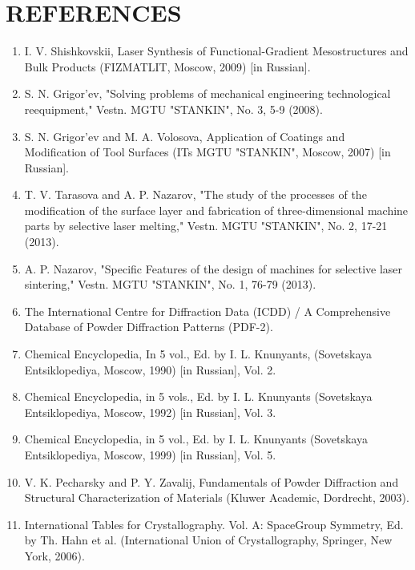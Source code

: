 \documentclass[10pt]{article}
\begin{document}
\section*{REFERENCES}
\begin{enumerate}
  \item I. V. Shishkovskii, Laser Synthesis of Functional-Gradient Mesostructures and Bulk Products (FIZMATLIT, Moscow, 2009) [in Russian].

  \item S. N. Grigor'ev, "Solving problems of mechanical engineering technological reequipment," Vestn. MGTU "STANKIN", No. 3, 5-9 (2008).

  \item S. N. Grigor'ev and M. A. Volosova, Application of Coatings and Modification of Tool Surfaces (ITs MGTU "STANKIN", Moscow, 2007) [in Russian].

  \item T. V. Tarasova and A. P. Nazarov, "The study of the processes of the modification of the surface layer and fabrication of three-dimensional machine parts by selective laser melting," Vestn. MGTU "STANKIN", No. 2, 17-21 (2013).

  \item A. P. Nazarov, "Specific Features of the design of machines for selective laser sintering," Vestn. MGTU "STANKIN", No. 1, 76-79 (2013).

  \item The International Centre for Diffraction Data (ICDD) / A Comprehensive Database of Powder Diffraction Patterns (PDF-2).

  \item Chemical Encyclopedia, In 5 vol., Ed. by I. L. Knunyants, (Sovetskaya Entsiklopediya, Moscow, 1990) [in Russian], Vol. 2.

  \item Chemical Encyclopedia, in 5 vols., Ed. by I. L. Knunyants (Sovetskaya Entsiklopediya, Moscow, 1992) [in Russian], Vol. 3.

  \item Chemical Encyclopedia, in 5 vol., Ed. by I. L. Knunyants (Sovetskaya Entsiklopediya, Moscow, 1999) [in Russian], Vol. 5.

  \item V. K. Pecharsky and P. Y. Zavalij, Fundamentals of Powder Diffraction and Structural Characterization of Materials (Kluwer Academic, Dordrecht, 2003).

  \item International Tables for Crystallography. Vol. A: SpaceGroup Symmetry, Ed. by Th. Hahn et al. (International Union of Crystallography, Springer, New York, 2006).


\end{enumerate}
\end{document}
